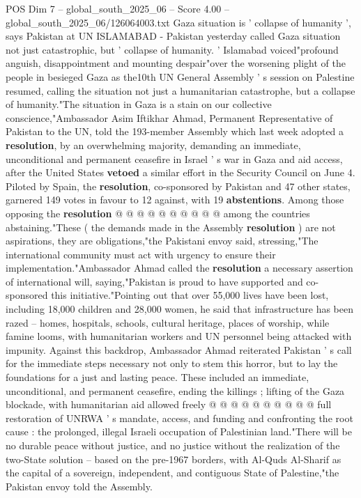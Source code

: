 \begin{textsample}{POS Dim 7 – global\_south\_2025\_06 – Score 4.00 – global\_south\_2025\_06/126064003.txt}  \label{ex:f7_pos_170}
Gaza situation is ' collapse of humanity ', says Pakistan at UN ISLAMABAD - Pakistan yesterday called Gaza situation not just catastrophic, but ' collapse of humanity. ' Islamabad voiced"profound anguish, disappointment and mounting despair"over the worsening plight of the people in besieged Gaza as the10th UN General Assembly ' s session on Palestine resumed, calling the situation not just a humanitarian catastrophe, but a collapse of humanity."The situation in Gaza is a stain on our collective conscience,"Ambassador Asim Iftikhar Ahmad, Permanent Representative of Pakistan to the UN, told the 193-member Assembly which last week adopted a \textbf{resolution}, by an overwhelming majority, demanding an immediate, unconditional and permanent ceasefire in Israel ' s war in Gaza and aid access, after the United States \textbf{vetoed} a similar effort in the Security Council on June 4.
Piloted by Spain, the \textbf{resolution}, co-sponsored by Pakistan and 47 other states, garnered 149 votes in favour to 12 against, with 19 \textbf{abstentions}.
Among those opposing the \textbf{resolution} @ @ @ @ @ @ @ @ @ @ among the countries abstaining."These ( the demands made in the Assembly \textbf{resolution} ) are not aspirations, they are obligations,"the Pakistani envoy said, stressing,"The international community must act with urgency to ensure their implementation."Ambassador Ahmad called the \textbf{resolution} a necessary assertion of international will, saying,"Pakistan is proud to have supported and co-sponsored this initiative."Pointing out that over 55,000 lives have been lost, including 18,000 children and 28,000 women, he said that infrastructure has been razed -- homes, hospitals, schools, cultural heritage, places of worship, while famine looms, with humanitarian workers and UN personnel being attacked with impunity.
Against this backdrop, Ambassador Ahmad reiterated Pakistan ' s call for the immediate steps necessary not only to stem this horror, but to lay the foundations for a just and lasting peace.
These included an immediate, unconditional, and permanent ceasefire, ending the killings ; lifting of the Gaza blockade, with humanitarian aid allowed freely @ @ @ @ @ @ @ @ @ @ full restoration of UNRWA ' s mandate, access, and funding and confronting the root cause : the prolonged, illegal Israeli occupation of Palestinian land."There will be no durable peace without justice, and no justice without the realization of the two-State solution -- based on the pre-1967 borders, with Al-Quds Al-Sharif as the capital of a sovereign, independent, and contiguous State of Palestine,"the Pakistan envoy told the Assembly.

\end{textsample}
